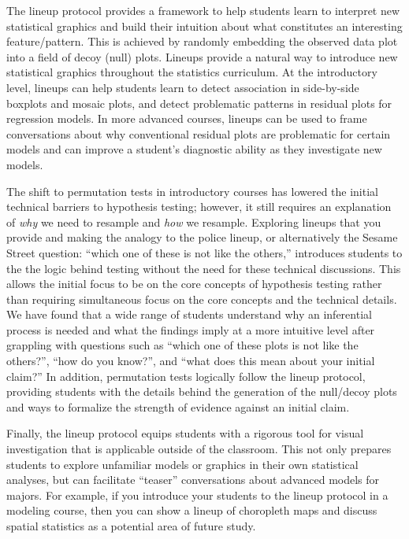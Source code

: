\documentclass[12pt]{article}
\begin{document}
\label{sec:conclusion}

The lineup protocol provides a framework to help students learn to
interpret new statistical graphics and build their intuition about what
constitutes an interesting feature/pattern. This is achieved by randomly
embedding the observed data plot into a field of decoy (null) plots.
Lineups provide a natural way to introduce new statistical graphics
throughout the statistics curriculum. At the introductory level, lineups
can help students learn to detect association in side-by-side boxplots
and mosaic plots, and detect problematic patterns in residual plots for
regression models. In more advanced courses, lineups can be used to
frame conversations about why conventional residual plots are
problematic for certain models and can improve a student's diagnostic
ability as they investigate new models.

The shift to permutation tests in introductory courses has lowered the
initial technical barriers to hypothesis testing; however, it still
requires an explanation of \emph{why} we need to resample and \emph{how}
we resample. Exploring lineups that you provide and making the analogy
to the police lineup, or alternatively the Sesame Street question:
``which one of these is not like the others,'' introduces students to
the the logic behind testing without the need for these technical
discussions. This allows the initial focus to be on the core concepts of
hypothesis testing rather than requiring simultaneous focus on the core
concepts and the technical details. We have found that a wide range of
students understand why an inferential process is needed and what the
findings imply at a more intuitive level after grappling with questions
such as ``which one of these plots is not like the others?'', ``how do
you know?'', and ``what does this mean about your initial claim?'' In
addition, permutation tests logically follow the lineup protocol,
providing students with the details behind the generation of the
null/decoy plots and ways to formalize the strength of evidence against
an initial claim.

Finally, the lineup protocol equips students with a rigorous tool for
visual investigation that is applicable outside of the classroom. This
not only prepares students to explore unfamiliar models or graphics in
their own statistical analyses, but can facilitate ``teaser''
conversations about advanced models for majors. For example, if you
introduce your students to the lineup protocol in a modeling course,
then you can show a lineup of choropleth maps and discuss spatial
statistics as a potential area of future study.
\end{document}

